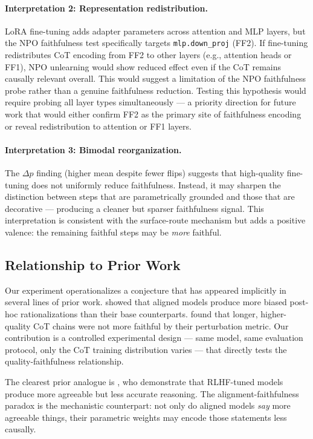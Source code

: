 \documentclass[11pt]{article}
\begin{document}
\paragraph{Interpretation 2: Representation redistribution.}
LoRA fine-tuning adds adapter parameters across attention and MLP layers, but
the NPO faithfulness test specifically targets \texttt{mlp.down\_proj} (FF2).
If fine-tuning redistributes CoT encoding from FF2 to other layers (e.g.,
attention heads or FF1), NPO unlearning would show reduced effect even if the
CoT remains causally relevant overall. This would suggest a limitation of the
NPO faithfulness probe rather than a genuine faithfulness reduction.
Testing this hypothesis would require probing all layer types simultaneously ---
a priority direction for future work that would either confirm FF2 as the
primary site of faithfulness encoding or reveal redistribution to attention or
FF1 layers.

\paragraph{Interpretation 3: Bimodal reorganization.}
The $\Delta p$ finding (higher mean despite fewer flips) suggests that
high-quality fine-tuning does not uniformly reduce faithfulness. Instead, it
may sharpen the distinction between steps that are parametrically grounded
and those that are decorative --- producing a cleaner but sparser faithfulness
signal. This interpretation is consistent with the surface-route mechanism but
adds a positive valence: the remaining faithful steps may be \emph{more}
faithful.

\subsection{Relationship to Prior Work}

Our experiment operationalizes a conjecture that has appeared implicitly in
several lines of prior work. \citet{turpin2023faithfulness} showed that
aligned models produce more biased post-hoc rationalizations than their base
counterparts. \citet{lanham2023measuring} found that longer, higher-quality
CoT chains were not more faithful by their perturbation metric. Our
contribution is a controlled experimental design --- same model, same
evaluation protocol, only the CoT training distribution varies --- that
directly tests the quality-faithfulness relationship.

The clearest prior analogue is \citet{perez2022sycophancy}, who demonstrate
that RLHF-tuned models produce more agreeable but less accurate reasoning.
The alignment-faithfulness paradox is the mechanistic counterpart: not only
do aligned models \emph{say} more agreeable things, their parametric weights
may encode those statements less causally.
\end{document}
